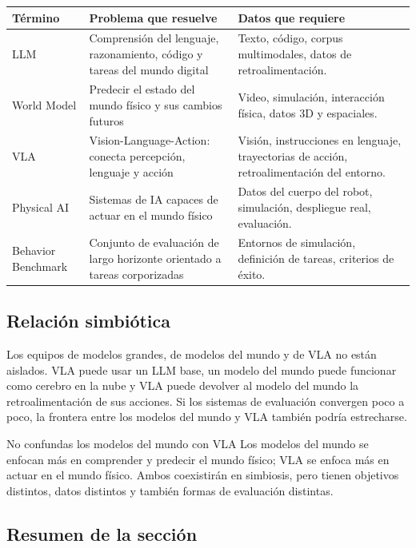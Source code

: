 \documentclass[a4paper]{article}
\begin{document}
\noindent\begin{tabularx}{\textwidth}{p{}p{}X}
\toprule
Término & Problema que resuelve & Datos que requiere \\
\midrule
LLM & Comprensión del lenguaje, razonamiento, código y tareas del mundo digital & Texto, código, corpus multimodales, datos de retroalimentación. \\
World Model & Predecir el estado del mundo físico y sus cambios futuros & Video, simulación, interacción física, datos 3D y espaciales. \\
VLA & Vision-Language-Action: conecta percepción, lenguaje y acción & Visión, instrucciones en lenguaje, trayectorias de acción, retroalimentación del entorno. \\
Physical AI & Sistemas de IA capaces de actuar en el mundo físico & Datos del cuerpo del robot, simulación, despliegue real, evaluación. \\
Behavior Benchmark & Conjunto de evaluación de largo horizonte orientado a tareas corporizadas & Entornos de simulación, definición de tareas, criterios de éxito. \\
\bottomrule
\end{tabularx}

\subsection{Relación simbiótica}

Los equipos de modelos grandes, de modelos del mundo y de VLA no están aislados. VLA puede usar un LLM base, un modelo del mundo puede funcionar como cerebro en la nube y VLA puede devolver al modelo del mundo la retroalimentación de sus acciones. Si los sistemas de evaluación convergen poco a poco, la frontera entre los modelos del mundo y VLA también podría estrecharse.

\begin{warningbox}{No confundas los modelos del mundo con VLA}
Los modelos del mundo se enfocan más en comprender y predecir el mundo físico; VLA se enfoca más en actuar en el mundo físico. Ambos coexistirán en simbiosis, pero tienen objetivos distintos, datos distintos y también formas de evaluación distintas.
\end{warningbox}

\subsection{Resumen de la sección}
\end{document}
